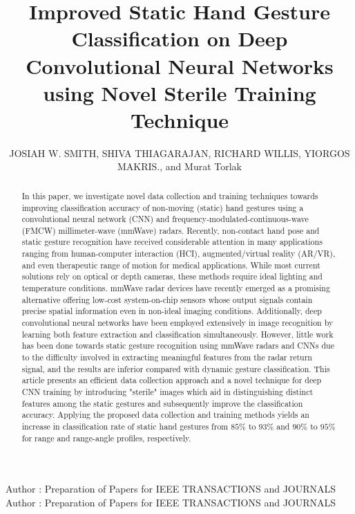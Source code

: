 \documentclass{ieeeaccess}
\begin{document}

\title{Improved Static Hand Gesture Classification on Deep Convolutional Neural Networks using Novel Sterile Training Technique}
\author{\uppercase{Josiah W. Smith, Shiva Thiagarajan, Richard Willis\footnotemark, Yiorgos Makris.}, and Murat Torlak}

\address[1]{Electrical and Computer Engineering, The University of Texas at Dallas,
800 W. Campbell Rd. Richardson, TX 75080 USA (e-mail: jws160130@utdallas.edu)}



\markboth
{Author \headeretal: Preparation of Papers for IEEE TRANSACTIONS and JOURNALS}
{Author \headeretal: Preparation of Papers for IEEE TRANSACTIONS and JOURNALS}


\begin{abstract}
In this paper, we investigate novel data collection and training techniques towards improving classification accuracy of non-moving (static) hand gestures using a convolutional neural network (CNN) and frequency-modulated-continuous-wave (FMCW) millimeter-wave (mmWave) radars. Recently, non-contact hand pose and static gesture recognition have received considerable attention in many applications ranging from human-computer interaction (HCI), augmented/virtual reality (AR/VR), and even therapeutic range of motion for medical applications. While most current solutions rely on optical or depth cameras, these methods require ideal lighting and temperature conditions. mmWave radar devices have recently emerged as a promising alternative offering low-cost system-on-chip sensors whose output signals contain precise spatial information even in non-ideal imaging conditions. Additionally, deep convolutional neural networks have been employed extensively in image recognition by learning both feature extraction and classification simultaneously. However, little work has been done towards static gesture recognition using mmWave radars and CNNs due to the difficulty involved in extracting meaningful features from the radar return signal, and the results are inferior compared with dynamic gesture classification. This article presents an efficient data collection approach and a novel technique for deep CNN training by introducing "sterile" images which aid in distinguishing distinct features among the static gestures and subsequently improve the classification accuracy. Applying the proposed data collection and training methods yields an increase in classification rate of static hand gestures from $85\%$ to $93\%$ and $90\%$ to $95\%$ for range and range-angle profiles, respectively.
\end{abstract}
\end{document}
